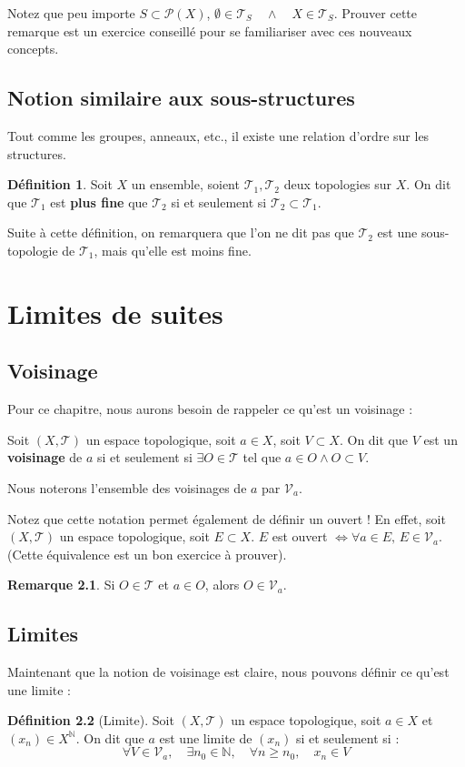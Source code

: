 \documentclass[12pt, a4paper]{report}
\theoremstyle{definition}
\newtheorem{definition}{Définition}[chapter]
\newtheorem{remarque}[definition]{Remarque}
\begin{document}
Notez que peu importe $S \subset \mathcal{P}(X)$, $\emptyset \in \mathcal{T}_S \quad \land \quad X \in \mathcal{T}_S$. Prouver cette remarque est un exercice conseillé pour se familiariser avec ces nouveaux concepts.

\section{Notion similaire aux sous-structures}
Tout comme les groupes, anneaux, etc., il existe une relation d'ordre sur les structures.
\begin{definition}
Soit $X$ un ensemble, soient $\mathcal{T}_1, \mathcal{T}_2$ deux topologies sur $X$. On dit que $\mathcal{T}_1$ est \textbf{plus fine} que $\mathcal{T}_2$ si et seulement si $\mathcal{T}_2 \subset \mathcal{T}_1$.
\end{definition}
Suite à cette définition, on remarquera que l'on ne dit pas que $\mathcal{T}_2$ est une sous-topologie de $\mathcal{T}_1$, mais qu'elle est moins fine.

\chapter{Limites de suites}
\section{Voisinage}
Pour ce chapitre, nous aurons besoin de rappeler ce qu'est un voisinage :

Soit $(X, \mathcal{T})$ un espace topologique, soit $a \in X$, soit $V \subset X$. On dit que $V$ est un \textbf{voisinage} de $a$ si et seulement si $\exists O \in \mathcal{T}$ tel que $a \in O \land O \subset V$.

Nous noterons l'ensemble des voisinages de $a$ par $\mathcal{V}_a$.

Notez que cette notation permet également de définir un ouvert ! En effet, soit $(X, \mathcal{T})$ un espace topologique, soit $E \subset X$. $E$ est ouvert $\iff \forall a \in E, \, E \in \mathcal{V}_a$. (Cette équivalence est un bon exercice à prouver).

\begin{remarque}
Si $O \in \mathcal{T}$ et $a \in O$, alors $O \in \mathcal{V}_a$.
\end{remarque}

\section{Limites}
Maintenant que la notion de voisinage est claire, nous pouvons définir ce qu'est une limite :
\begin{definition}[Limite]
Soit $(X, \mathcal{T})$ un espace topologique, soit $a \in X$ et $(x_n) \in X^{\mathbb{N}}$. On dit que $a$ est une limite de $(x_n)$ si et seulement si :
\[ \forall V \in \mathcal{V}_a, \quad \exists n_0 \in \mathbb{N}, \quad \forall n \ge n_0, \quad x_n \in V \]
\end{definition}
\end{document}
